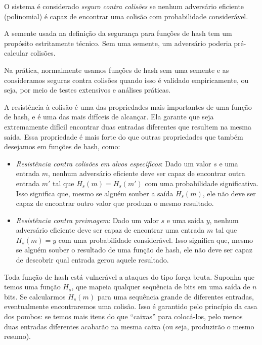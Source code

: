 O sistema é considerado {\em seguro contra colisões} se nenhum adversário eficiente (polinomial) é capaz de encontrar uma colisão com probabilidade considerável.

\begin{center}
\end{center}

A semente usada na definição da segurança para funções de hash tem um propósito estritamente técnico.
Sem uma semente, um adversário poderia pré-calcular colisões.

Na prática, normalmente usamos funções de hash sem uma semente e as consideramos seguras contra colisões quando isso é validado empiricamente, ou seja, por meio de testes extensivos e análises práticas.

A resistência à colisão é uma das propriedades mais importantes de uma função de hash, e é uma das mais difíceis de alcançar.
Ela garante que seja extremamente difícil encontrar duas entradas diferentes que resultem na mesma saída.
Essa propriedade é mais forte do que outras propriedades que também desejamos em funções de hash, como:
\begin{itemize}
\item[] {\em Resistência contra colisões em alvos específicos}:
  Dado um valor $s$ e uma entrada $m$, nenhum adversário eficiente deve ser capaz de encontrar outra entrada $m'$  tal que $H_s(m) = H_s(m')$ com uma probabilidade significativa.
  Isso significa que, mesmo se alguém souber a saída $H_s(m)$, ele não deve ser capaz de encontrar outro valor que produza o mesmo resultado.
\item[] {\em Resistência contra preimagem}:
  Dado um valor $s$ e uma saída $y$, nenhum adversário eficiente deve ser capaz de encontrar uma entrada $m$ tal que $H_s(m)=y$ com uma probabilidade considerável.
  Isso significa que, mesmo se alguém souber o resultado de uma função de hash, ele não deve ser capaz de descobrir qual entrada gerou aquele resultado.
\end{itemize}


Toda função de hash está vulnerável a ataques do tipo força bruta. Suponha que temos uma função $H_s$, que mapeia qualquer sequência de bits em uma saída de $n$ bits.
Se calcularmos $H_s(m)$ para uma sequência grande de diferentes entradas, eventualmente encontraremos uma colisão.
Isso é garantido pelo princípio da casa dos pombos:
se temos mais itens do que ``caixas'' para colocá-los, pelo menos duas entradas diferentes acabarão na mesma caixa (ou seja, produzirão o mesmo resumo).


